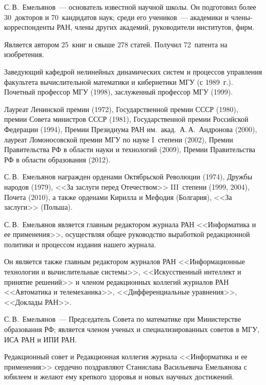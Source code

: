\begin{multicols}{2}
     С.\,В.~Емельянов~--- основатель известной научной школы. Он подготовил более 30~докторов и 70~кандидатов
наук; среди его учеников~--- академики и чле\-ны-кор\-рес\-пон\-ден\-ты РАН, члены других академий, руководители институтов, фирм.

     Является автором 25~книг и свыше 278 статей. Получил 72~патента на изобретения.

     Заведующий кафедрой нелинейных динамических систем и процессов управления факультета вычислительной
математики и кибернетики МГУ (с 1989~г.). Почетный профессор МГУ (1998), заслуженный профессор МГУ (1999).

     Лауреат Ленинской премии (1972), Государственной премии СССР (1980), премии Совета министров СССР (1981),
Государственной премии Российской Федерации (1994), Премии Президиума РАН им.\ акад.\ А.\,А.~Андронова (2000),
лауреат Ломоносовской премии МГУ по науке I~степени (2002), Премии Правительства РФ в области науки и технологий
(2009), Премии Правительства РФ в области образования (2012).


     С.\,В.~Емельянов награжден орденами Октябрьской Революции (1974), Дружбы народов (1979),
<<За заслуги перед
Отечеством>> III~степени (1999, 2004), Почета (2010), а также орденами Кирилла и Мефодия (Болгария), <<За заслуги>>
(Польша).

     С.\,В.~Емельянов является главным редактором журнала РАН <<Информатика и ее применения>>, осуществляя
общее руководство выработкой редакционной политики и процессом издания нашего журнала.

     Он является также главным редактором журналов РАН <<Информационные технологии и вы\-чис\-ли\-тель\-ные
системы>>, <<Искусственный интеллект и принятие решений>> и членом редакционных коллегий журналов РАН
<<Автоматика и телемеханика>>, <<Дифференциальные уравнения>>, <<Доклады РАН>>.

     С.\,В.~Емельянов~--- Председатель Совета по математике при Министерстве образования РФ; является членом
ученых и специализированных советов в МГУ, ИСА РАН и ИПИ РАН.

     \bigskip

     Редакционный совет и Редакционная коллегия журнала <<Информатика и ее применения>> сердечно поздравляют
Станислава Васильевича Емельянова с юбилеем и желают ему крепкого здоровья и новых научных достижений.

   \thispagestyle{empty}




\end{multicols}

